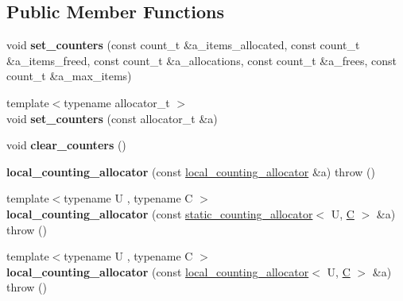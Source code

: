 \subsection*{Public Member Functions}
\begin{DoxyCompactItemize}
\item 
\hypertarget{classlocal__counting__allocator_a20b97b26b4633f1f83dd5b97b7db8ca4}{}void {\bfseries set\+\_\+counters} (const count\+\_\+t \&a\+\_\+items\+\_\+allocated, const count\+\_\+t \&a\+\_\+items\+\_\+freed, const count\+\_\+t \&a\+\_\+allocations, const count\+\_\+t \&a\+\_\+frees, const count\+\_\+t \&a\+\_\+max\+\_\+items)\label{classlocal__counting__allocator_a20b97b26b4633f1f83dd5b97b7db8ca4}

\item 
\hypertarget{classlocal__counting__allocator_a7c36c12597164a2c2524819d9706d88f}{}{\footnotesize template$<$typename allocator\+\_\+t $>$ }\\void {\bfseries set\+\_\+counters} (const allocator\+\_\+t \&a)\label{classlocal__counting__allocator_a7c36c12597164a2c2524819d9706d88f}

\item 
\hypertarget{classlocal__counting__allocator_a9b52249bb44d1d2fcadaf33ec95d7b72}{}void {\bfseries clear\+\_\+counters} ()\label{classlocal__counting__allocator_a9b52249bb44d1d2fcadaf33ec95d7b72}

\item 
\hypertarget{classlocal__counting__allocator_a0880d56f3f6de5142bdcd0cd89405a93}{}{\bfseries local\+\_\+counting\+\_\+allocator} (const \hyperlink{classlocal__counting__allocator}{local\+\_\+counting\+\_\+allocator} \&a)  throw ()\label{classlocal__counting__allocator_a0880d56f3f6de5142bdcd0cd89405a93}

\item 
\hypertarget{classlocal__counting__allocator_a4226d7c01f928cbba303413d43e3e1e2}{}{\footnotesize template$<$typename U , typename C $>$ }\\{\bfseries local\+\_\+counting\+\_\+allocator} (const \hyperlink{classstatic__counting__allocator}{static\+\_\+counting\+\_\+allocator}$<$ U, \hyperlink{classC}{C} $>$ \&a)  throw ()\label{classlocal__counting__allocator_a4226d7c01f928cbba303413d43e3e1e2}

\item 
\hypertarget{classlocal__counting__allocator_a8d283a0835692aa40e2da8f870ae4cf9}{}{\footnotesize template$<$typename U , typename C $>$ }\\{\bfseries local\+\_\+counting\+\_\+allocator} (const \hyperlink{classlocal__counting__allocator}{local\+\_\+counting\+\_\+allocator}$<$ U, \hyperlink{classC}{C} $>$ \&a)  throw ()\label{classlocal__counting__allocator_a8d283a0835692aa40e2da8f870ae4cf9}


\end{DoxyCompactItemize}
